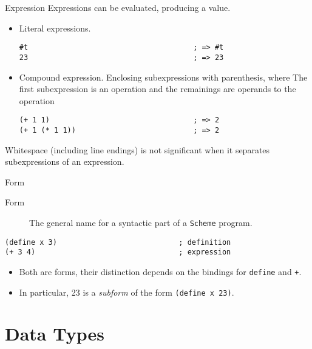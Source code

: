 \documentclass[presentation]{beamer}
\begin{document}
\begin{frame}[fragile,label={sec:orgheadline8}]{Expression}
 Expressions can be evaluated, producing a value.

\begin{itemize}
\item Literal expressions.

\begin{verbatim}
#t                                      ; => #t
23                                      ; => 23
\end{verbatim}

\item Compound expression.  Enclosing subexpressions with parenthesis,
where The first subexpression is an operation and the remainings
are operands to the operation

\begin{verbatim}
(+ 1 1)                                 ; => 2
(+ 1 (* 1 1))                           ; => 2
\end{verbatim}
\end{itemize}


Whitespace (including line endings) is not significant when it
separates subexpressions of an expression.
\end{frame}

\begin{frame}[fragile,label={sec:orgheadline9}]{Form}
 \begin{description}
\item[{Form}] The general name for a syntactic part of a \texttt{Scheme}
        program.
\end{description}


\begin{verbatim}
(define x 3)                            ; definition
(+ 3 4)                                 ; expression
\end{verbatim}

\begin{itemize}
\item Both are forms, their distinction depends on the bindings for
\texttt{define} and \texttt{+}.
\item In particular, 23 is a \emph{subform} of the form \texttt{(define x 23)}.
\end{itemize}
\end{frame}

\section{Data Types}
\label{sec:orgheadline27}
\end{document}
